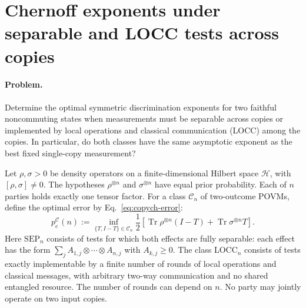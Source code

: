 \section{Chernoff exponents under separable and LOCC tests across copies}
\label{sec:op_a370855db65d4d24}

\paragraph{Problem.}
Determine the optimal symmetric discrimination exponents for two faithful noncommuting states when measurements must be separable across copies or implemented by local operations and classical communication (LOCC) among the copies. In particular, do both classes have the same asymptotic exponent as the best fixed single-copy measurement?

Let $\rho,\sigma>0$ be density operators on a finite-dimensional Hilbert space $\mathcal H$, with $[\rho,\sigma]\neq0$. The hypotheses $\rho^{\otimes n}$ and $\sigma^{\otimes n}$ have equal prior probability. Each of $n$ parties holds exactly one tensor factor. For a class $\mathcal C_n$ of two-outcome POVMs, define the optimal error by Eq.~\eqref{eq:copych-error}:
\begin{equation}
p_e^{\mathcal C}(n):=\inf_{\{T,I-T\}\in\mathcal C_n}\frac12\left[\operatorname{Tr}\rho^{\otimes n}(I-T)+\operatorname{Tr}\sigma^{\otimes n}T\right].
\label{eq:copych-error}
\end{equation}
Here $\mathrm{SEP}_n$ consists of tests for which both effects are fully separable: each effect has the form $\sum_j A_{1,j}\otimes\cdots\otimes A_{n,j}$ with $A_{k,j}\geq0$. The class $\mathrm{LOCC}_n$ consists of tests exactly implementable by a finite number of rounds of local operations and classical messages, with arbitrary two-way communication and no shared entangled resource. The number of rounds can depend on $n$. No party may jointly operate on two input copies.

